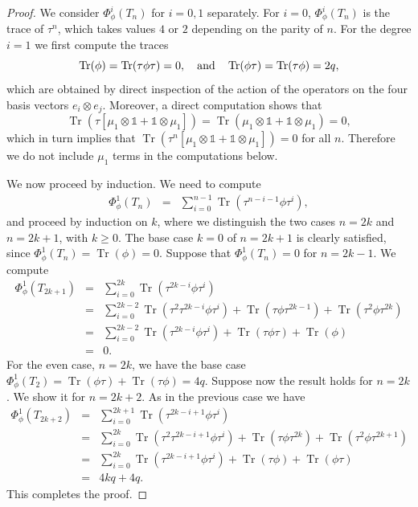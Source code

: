 \documentclass[11pt,fleqn]{amsart} %
\DeclareMathOperator{\tr}{Tr}
\begin{document}
\begin{proof}
		We consider $\Phi_\phi^i(T_n)$ for $i=0,1$ separately. For $i=0$, $\Phi_\phi^i(T_n)$ is the trace of $\tau^n$, which takes values $4$  or  
		$2$ depending on the parity of $n$. For the degree $i=1$ we first compute the traces 
		$$\tr (\phi) = \tr (\tau\phi\tau) =0, \quad {\rm and} \quad \tr (\phi\tau) = \tr (\tau\phi) = 2q, $$
		which are obtained by direct inspection of the action of the operators on the four basis vectors $e_i\otimes e_j$. 
	Moreover, a direct computation shows that 
	$$\tr (\tau[\mu_1\otimes \mathbb 1 + \mathbb 1\otimes \mu_1]) = \tr (\mu_1\otimes \mathbb 1 + \mathbb 1\otimes \mu_1) = 0, $$
	 which in turn implies that $\tr (\tau^n[\mu_1\otimes \mathbb 1 + \mathbb 1\otimes \mu_1])=0$ for all $n$. 
     Therefore we do not include $\mu_1$ terms in the computations below. 
			
		We now proceed by induction. 
		We need to compute 
		\begin{eqnarray*}
				\Phi^1_\phi(T_n) &=& \sum_{i=0}^{n-1} \tr (\tau^{n-i-1}\phi\tau^i), 
		\end{eqnarray*} 
			and proceed by induction on $k$, where we distinguish the two cases $n=2k$ and $n=2k+1$, with $k\geq 0$. The base case $k=0$ of $n=2k+1$ is clearly satisfied, since $\Phi^1_\phi(T_n) = \tr (\phi) = 0$. Suppose that $\Phi^1_\phi(T_n) = 0$ for $n = 2k-1$. We compute
		\begin{eqnarray*}
					\Phi^1_\phi(T_{2k+1}) 
					&=&  \sum_{i=0}^{2k} \tr (\tau^{2k-i}\phi\tau^i)\\
					&=& \sum_{i=0}^{2k-2} \tr (\tau^2\tau^{2k-i}\phi\tau^i) + \tr (\tau \phi \tau^{2k-1}) + \tr (\tau^2 \phi \tau^{2k})\\
					&=& \sum_{i=0}^{2k-2} \tr (\tau^{2k-i}\phi\tau^i) + \tr (\tau \phi \tau) + \tr (\phi)\\
					&=& 0. 
		\end{eqnarray*}
		For the even case, $n = 2k$, we have the base case $\Phi^1_\phi(T_2) =   \tr (\phi\tau) +  \tr (\tau\phi) = 4q$. Suppose now the result holds for $n=2k$. We 
		show it for $n=2k+2$. As in the previous case we have 
		\begin{eqnarray*}
			\Phi^1_\phi(T_{2k+2}) 
			&=&  \sum_{i=0}^{2k+1} \tr (\tau^{2k-i+1}\phi\tau^i)\\
			&=& \sum_{i=0}^{2k} \tr (\tau^2\tau^{2k-i+1}\phi\tau^i) + \tr (\tau \phi \tau^{2k}) + \tr (\tau^2 \phi \tau^{2k+1})\\
			&=& \sum_{i=0}^{2k} \tr (\tau^{2k-i+1}\phi\tau^i) + \tr (\tau \phi) + \tr (\phi\tau)\\
			&=& 4kq+4q.  
		\end{eqnarray*}
		This completes the proof. 
\end{proof}
\end{document}
